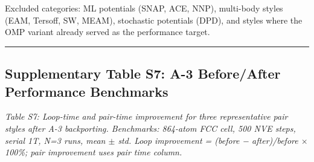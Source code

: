 \documentclass[
  11pt,
]{article}
\begin{document}
Excluded categories: ML potentials (SNAP, ACE, NNP), multi-body styles
(EAM, Tersoff, SW, MEAM), stochastic potentials (DPD), and styles where
the OMP variant already served as the performance target.

\begin{center}\rule{0.5\linewidth}{0.5pt}\end{center}

\subsection{Supplementary Table S7: A-3 Before/After Performance
Benchmarks}\label{supplementary-table-s7-a-3-beforeafter-performance-benchmarks}

\emph{Table S7: Loop-time and pair-time improvement for three
representative pair styles after A-3 backporting. Benchmarks: 864-atom
FCC cell, 500 NVE steps, serial 1T, N=3 runs, mean \(\pm\) std. Loop
improvement = (before − after)/before \(\times\) 100\%; pair improvement
uses pair time column.}
\end{document}

